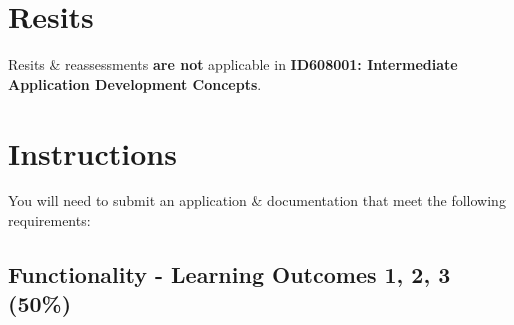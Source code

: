 \documentclass{article}
\begin{document}
\section*{Resits}
Resits \& reassessments \textbf{are not} applicable in \textbf{ID608001: Intermediate Application Development Concepts}.

\section*{Instructions}
You will need to submit an application \& documentation that meet the following requirements:

\subsection*{Functionality - Learning Outcomes 1, 2, 3 (50\%)}
\end{document}
